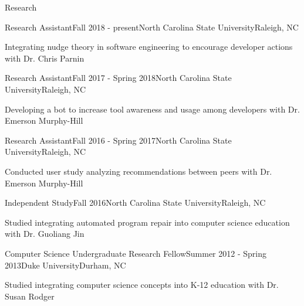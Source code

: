 \documentclass{resume} %
\begin{document}

\begin{rSection}{Research}


\begin{rSubsection}{Research Assistant}{Fall 2018 - present}{North Carolina State University}{Raleigh, NC}
\item Integrating nudge theory in software engineering to encourage developer actions with Dr. Chris Parnin
\end{rSubsection}


\begin{rSubsection}{Research Assistant}{Fall 2017 - Spring 2018}{North Carolina State University}{Raleigh, NC}
\item Developing a bot to increase tool awareness and usage among developers with Dr. Emerson Murphy-Hill
\end{rSubsection}


\begin{rSubsection}{Research Assistant}{Fall 2016 - Spring 2017}{North Carolina State University}{Raleigh, NC}
\item Conducted user study analyzing recommendations between peers with Dr. Emerson Murphy-Hill
\end{rSubsection}


\begin{rSubsection}{Independent Study}{Fall 2016}{North Carolina State University}{Raleigh, NC}
\item Studied integrating automated program repair into computer science education with Dr. Guoliang Jin
\end{rSubsection}


\begin{rSubsection}{Computer Science Undergraduate Research Fellow}{Summer 2012 - Spring 2013}{Duke University}{Durham, NC}
\item Studied integrating computer science concepts into K-12 education with Dr. Susan Rodger
\end{rSubsection}


\end{rSection}
\end{document}
